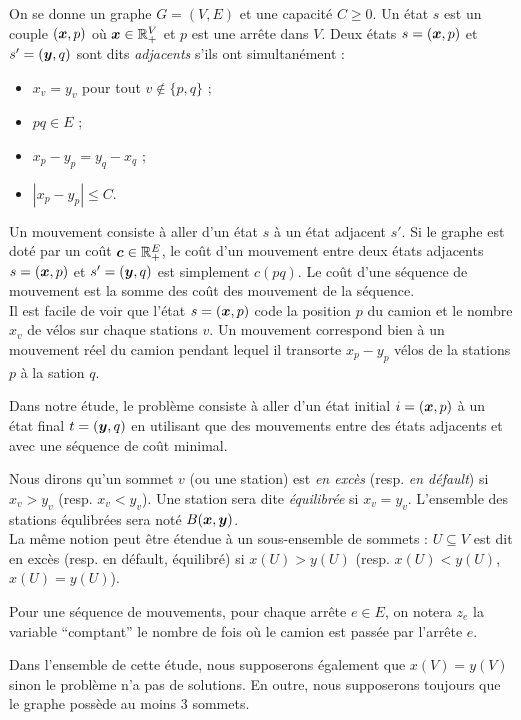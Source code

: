 \documentclass[twoside,11pt,openany,a4paper]{rapport}
\begin{document}
On se donne un graphe $G=(V,E)$ et une capacité $C \ge 0$. Un état $s$ est un couple $(\boldsymbol{x},p)$ où $\boldsymbol{x} \in \mathbb{R}^V_+$ et $p$ est une arrête dans $V$. Deux états $s=(\boldsymbol{x},p)$ et $s'=(\boldsymbol{y},q)$ sont dits \emph{adjacents} s'ils ont simultanément :
\begin{itemize}
\item $x_v=y_v$ pour tout $v \notin \{p,q\}$ ;
\item $pq \in E$ ;
\item $x_p-y_p = y_q-x_q$ ;
\item $\left| x_p-y_p \right| \le C$.
\end{itemize}

Un mouvement consiste à aller d'un état $s$ à un état adjacent $s'$. Si le graphe est doté par un coût $\boldsymbol{c} \in \mathbb{R}^E_+$, le coût d'un mouvement entre deux états adjacents $s=(\boldsymbol{x},p)$ et $s'=(\boldsymbol{y},q)$ est simplement $c(pq)$. Le coût d'une séquence de mouvement est la somme des coût des mouvement de la séquence.
\\

Il est facile de voir que l'état $s=(\boldsymbol{x},p)$ code la position $p$ du camion et le nombre $x_v$ de vélos sur chaque stations $v$. Un mouvement correspond bien à un mouvement réel du camion pendant lequel il transorte $x_p-y_p$ vélos de la stations $p$ à la sation $q$.

Dans notre étude, le problème consiste à aller d'un état initial $i=(\boldsymbol{x},p)$ à un état final $t=(\boldsymbol{y},q)$ en utilisant que des mouvements entre des états adjacents et avec une séquence de coût minimal.

Nous dirons qu'un sommet $v$ (ou une station) est \emph{en excès} (resp. \emph{en défault}) si $x_v > y_v$ (resp. $x_v < y_v$). Une station sera dite \emph{équilibrée} si $x_v=y_v$. L'ensemble des stations équlibrées sera noté $B(\boldsymbol{x},\boldsymbol{y})$.
\\
La même notion peut être étendue à un sous-ensemble de sommets : $U \subseteq V$ est dit en excès (resp. en défault, équilibré) si $x(U) > y(U)$ (resp. $x(U) < y(U)$, $x(U) = y(U)$).

Pour une séquence de mouvements, pour chaque arrête $e \in E$, on notera $z_e$ la variable ``comptant'' le nombre de fois où le camion est passée par l'arrête $e$.

Dans l'ensemble de cette étude, nous supposerons également que $x(V) = y(V)$ sinon le problème n'a pas de solutions. En outre, nous supposerons toujours que le graphe possède au moins 3 sommets.
\\
\end{document}
